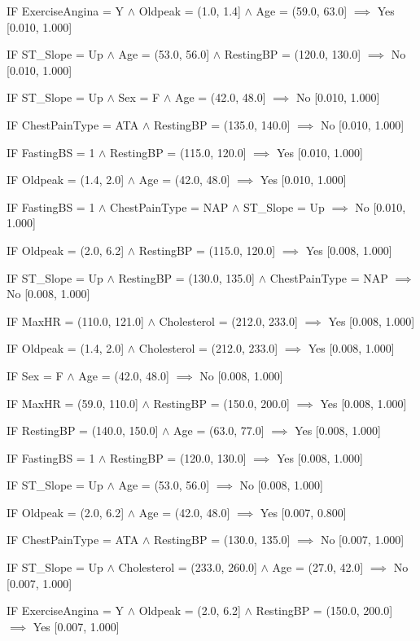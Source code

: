 IF ExerciseAngina = Y $\land$ Oldpeak = (1.0, 1.4] $\land$ Age = (59.0, 63.0] $\implies$ Yes [0.010, 1.000]

IF ST_Slope = Up $\land$ Age = (53.0, 56.0] $\land$ RestingBP = (120.0, 130.0] $\implies$ No [0.010, 1.000]

IF ST_Slope = Up $\land$ Sex = F $\land$ Age = (42.0, 48.0] $\implies$ No [0.010, 1.000]

IF ChestPainType = ATA $\land$ RestingBP = (135.0, 140.0] $\implies$ No [0.010, 1.000]

IF FastingBS = 1 $\land$ RestingBP = (115.0, 120.0] $\implies$ Yes [0.010, 1.000]

IF Oldpeak = (1.4, 2.0] $\land$ Age = (42.0, 48.0] $\implies$ Yes [0.010, 1.000]

IF FastingBS = 1 $\land$ ChestPainType = NAP $\land$ ST_Slope = Up $\implies$ No [0.010, 1.000]

IF Oldpeak = (2.0, 6.2] $\land$ RestingBP = (115.0, 120.0] $\implies$ Yes [0.008, 1.000]

IF ST_Slope = Up $\land$ RestingBP = (130.0, 135.0] $\land$ ChestPainType = NAP $\implies$ No [0.008, 1.000]

IF MaxHR = (110.0, 121.0] $\land$ Cholesterol = (212.0, 233.0] $\implies$ Yes [0.008, 1.000]

IF Oldpeak = (1.4, 2.0] $\land$ Cholesterol = (212.0, 233.0] $\implies$ Yes [0.008, 1.000]

IF Sex = F $\land$ Age = (42.0, 48.0] $\implies$ No [0.008, 1.000]

IF MaxHR = (59.0, 110.0] $\land$ RestingBP = (150.0, 200.0] $\implies$ Yes [0.008, 1.000]

IF RestingBP = (140.0, 150.0] $\land$ Age = (63.0, 77.0] $\implies$ Yes [0.008, 1.000]

IF FastingBS = 1 $\land$ RestingBP = (120.0, 130.0] $\implies$ Yes [0.008, 1.000]

IF ST_Slope = Up $\land$ Age = (53.0, 56.0] $\implies$ No [0.008, 1.000]

IF Oldpeak = (2.0, 6.2] $\land$ Age = (42.0, 48.0] $\implies$ Yes [0.007, 0.800]

IF ChestPainType = ATA $\land$ RestingBP = (130.0, 135.0] $\implies$ No [0.007, 1.000]

IF ST_Slope = Up $\land$ Cholesterol = (233.0, 260.0] $\land$ Age = (27.0, 42.0] $\implies$ No [0.007, 1.000]

IF ExerciseAngina = Y $\land$ Oldpeak = (2.0, 6.2] $\land$ RestingBP = (150.0, 200.0] $\implies$ Yes [0.007, 1.000]

